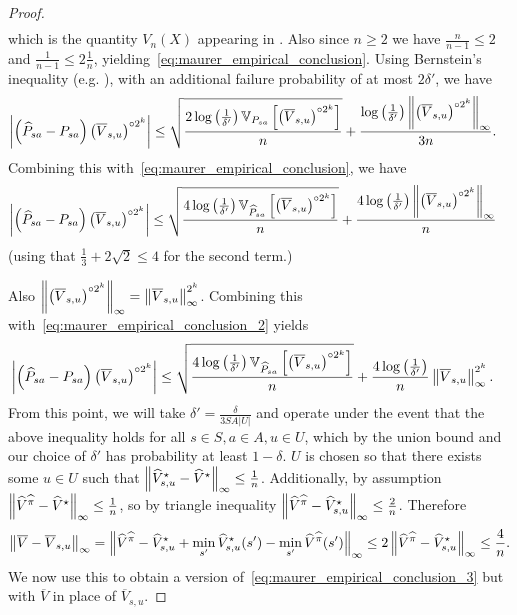 \documentclass{article}
\theoremstyle{plain}
\theoremstyle{plain}
\theoremstyle{remark}
\theoremstyle{plain}
\theoremstyle{plain}
\newcommand{\Var}{\mathbb{V}}
\newcommand{\Phat}{\widehat{P}}
\newcommand{\Vhat}{\widehat{V}}
\newcommand{\pihat}{\widehat{\pi}}
\newcommand{\Vhatstar}{\widehat{V}^\star}
\newcommand{\Vc}{\overline{V}}
\begin{document}
\begin{proof}
\begin{align*}
\end{align*}
which is the quantity $V_n(X)$ appearing in \cite[Theorem 10]{maurer_empirical_2009}. Also since $n \geq 2$ we have $\frac{n}{n-1} \leq 2$ and $\frac{1}{n-1} \leq 2 \frac{1}{n}$, yielding~\eqref{eq:maurer_empirical_conclusion}. Using Bernstein's inequality (e.g. \cite[Theorem 3]{maurer_empirical_2009}), with an additional failure probability of at most $2\delta'$, we have 
\begin{align}
        \left|\left(\Phat_{sa} - P_{sa} \right) \left(\Vc_{s,u} \right)^{\circ 2^k}\right| & \leq \sqrt{\frac{2\log\left( \frac{1}{\delta'}\right) \Var_{P_{sa}} \left[ \left(\Vc_{s,u} \right)^{\circ 2^k} \right]    }{n }} + \frac{\log\left( \frac{1}{\delta'}\right) \infnorm{\left(\Vc_{s,u} \right)^{\circ 2^k}}}{3n}.
\end{align}
Combining this with~\eqref{eq:maurer_empirical_conclusion}, we have
\begin{align}
        \left|\left(\Phat_{sa} - P_{sa} \right) \left(\Vc_{s,u} \right)^{\circ 2^k}\right| & \leq \sqrt{\frac{4\log\left( \frac{1}{\delta'}\right) \Var_{\Phat_{sa}} \left[ \left(\Vc_{s,u} \right)^{\circ 2^k} \right]    }{n }} + \frac{4\log\left( \frac{1}{\delta'}\right) \infnorm{\left(\Vc_{s,u} \right)^{\circ 2^k}}}{n}\label{eq:maurer_empirical_conclusion_2}
\end{align}
(using that $\frac{1}{3} + 2 \sqrt{2} \leq 4$ for the second term.)

Also $\infnorm{\left(\Vc_{s,u} \right)^{\circ 2^k}} = \infnorm{\Vc_{s,u}} ^{ 2^k}$.
Combining this with~\eqref{eq:maurer_empirical_conclusion_2} yields
\begin{align}
        \left|\left(\Phat_{sa} - P_{sa} \right) \left(\Vc_{s,u} \right)^{\circ 2^k}\right| & \leq \sqrt{\frac{4\log\left( \frac{1}{\delta'}\right) \Var_{\Phat_{sa}} \left[ \left(\Vc_{s,u} \right)^{\circ 2^k} \right]    }{n }} + \frac{4 \log\left( \frac{1}{\delta'}\right) }{n}\infnorm{\Vc_{s,u}}^{2^k}\label{eq:maurer_empirical_conclusion_3}.
\end{align}
From this point, we will take $\delta' = \frac{\delta}{3SA |U|}$ and operate under the event that the above inequality holds for all $s \in S, a \in A, u \in U$, which by the union bound and our choice of $\delta'$ has probability at least $1 - \delta$.
$U$ is chosen so that there exists some $u \in U$ such that $\infnorm{\Vhatstar_{s,u} - \Vhatstar} \leq \frac{1}{n}$. Additionally, by assumption $\infnorm{\Vhat^{\pihat} - \Vhatstar} \leq \frac{1}{n}$, so by triangle inequality $\infnorm{\Vhat^{\pihat} - \Vhatstar_{s,u}} \leq \frac{2}{n}$. 
Therefore
\begin{align*}
    \infnorm{\Vc - \Vc_{s,u}} = \infnorm{\Vhat^{\pihat} - \Vhatstar_{s,u} + \min_{s'}\Vhatstar_{s,u}(s') - \min_{s'}\Vhat^{\pihat}(s')} \leq 2 \infnorm{\Vhat^{\pihat} - \Vhatstar_{s,u}} \leq \frac{4}{n}.
\end{align*}
We now use this to obtain a version of~\eqref{eq:maurer_empirical_conclusion_3} but with $\Vc$ in place of $\Vc_{s,u}$.


\end{proof}
\end{document}

